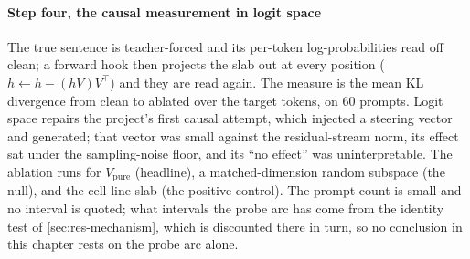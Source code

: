 \paragraph{Step four, the causal measurement in logit space} The true sentence is
teacher-forced and its per-token log-probabilities read off clean; a forward hook
then projects the slab out at every position ($h \leftarrow h - (hV)V^{\top}$)
and they are read again. The measure is the mean KL divergence from clean to
ablated over the target tokens, on $60$ prompts. Logit space repairs the
project's first causal attempt, which injected a steering vector and generated;
that vector was small against the residual-stream norm, its effect sat under the
sampling-noise floor, and its ``no effect'' was uninterpretable. The ablation runs
for $V_{\textrm{pure}}$ (headline), a matched-dimension random subspace (the
null), and the cell-line slab (the positive control). The prompt count is small
and no interval is quoted; what intervals the probe arc has come from the
identity test of \cref{sec:res-mechanism}, which is discounted there in turn, so
no conclusion in this chapter rests on the probe arc alone.

